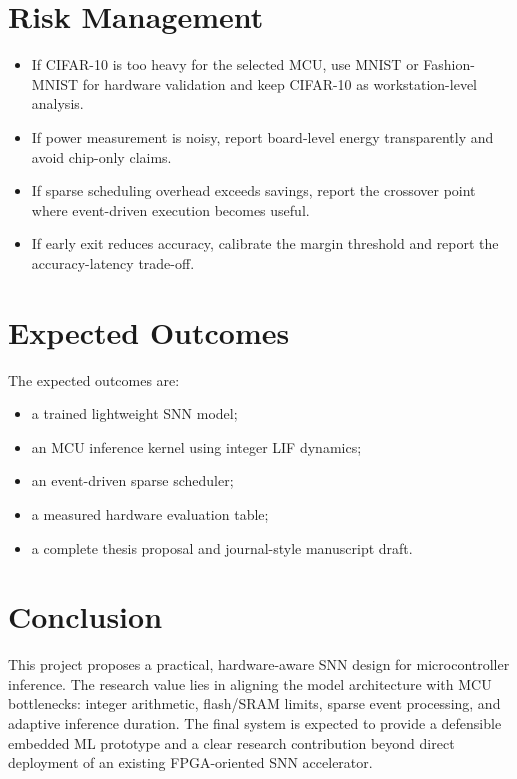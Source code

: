 \documentclass[12pt]{article}
\begin{document}
\section{Risk Management}
\begin{itemize}
    \item If CIFAR-10 is too heavy for the selected MCU, use MNIST or Fashion-MNIST for hardware validation and keep CIFAR-10 as workstation-level analysis.
    \item If power measurement is noisy, report board-level energy transparently and avoid chip-only claims.
    \item If sparse scheduling overhead exceeds savings, report the crossover point where event-driven execution becomes useful.
    \item If early exit reduces accuracy, calibrate the margin threshold and report the accuracy-latency trade-off.
\end{itemize}

\section{Expected Outcomes}
The expected outcomes are:
\begin{itemize}
    \item a trained lightweight SNN model;
    \item an MCU inference kernel using integer LIF dynamics;
    \item an event-driven sparse scheduler;
    \item a measured hardware evaluation table;
    \item a complete thesis proposal and journal-style manuscript draft.
\end{itemize}

\section{Conclusion}
This project proposes a practical, hardware-aware SNN design for microcontroller inference. The research value lies in aligning the model architecture with MCU bottlenecks: integer arithmetic, flash/SRAM limits, sparse event processing, and adaptive inference duration. The final system is expected to provide a defensible embedded ML prototype and a clear research contribution beyond direct deployment of an existing FPGA-oriented SNN accelerator.



\end{document}
